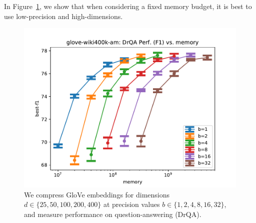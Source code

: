 In Figure~\ref{fig:glove400k_dim_vs_prec}, we show that when considering a fixed memory budget, it is best to use low-precision and high-dimensions.

\begin{figure}
	\begin{center}
		\centerline{\includegraphics[width=\columnwidth]{figures/glove-wiki400k-am_drqa_vs_compression.pdf}}
		\caption{We compress GloVe embeddings for dimensions $d\in\{25,50,100,200,400\}$ at precision values $b\in\{1,2,4,8,16,32\}$, and measure performance on question-answering (DrQA).  }
		\label{fig:glove400k_dim_vs_prec}
	\end{center}
\end{figure}
